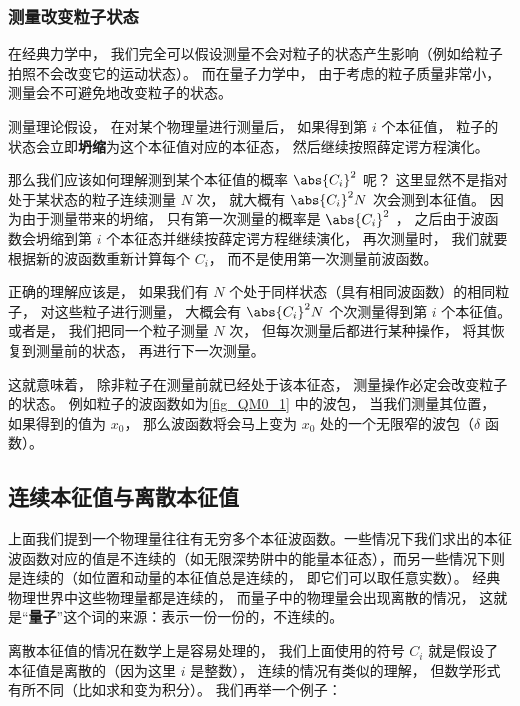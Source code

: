 \subsubsection{测量改变粒子状态}
在经典力学中， 我们完全可以假设测量不会对粒子的状态产生影响（例如给粒子拍照不会改变它的运动状态）。 而在量子力学中， 由于考虑的粒子质量非常小， 测量会不可避免地改变粒子的状态。

测量理论假设， 在对某个物理量进行测量后， 如果得到第 $i$ 个本征值， 粒子的状态会立即\textbf{坍缩}为这个本征值对应的本征态， 然后继续按照薛定谔方程演化。

那么我们应该如何理解测到某个本征值的概率 $\abs{C_i}^2$ 呢？ 这里显然不是指对处于某状态的粒子连续测量 $N$ 次， 就大概有 $\abs{C_i}^2 N$ 次会测到本征值。 因为由于测量带来的坍缩， 只有第一次测量的概率是 $\abs{C_i}^2$ ， 之后由于波函数会坍缩到第 $i$ 个本征态并继续按薛定谔方程继续演化， 再次测量时， 我们就要根据新的波函数重新计算每个 $C_i$， 而不是使用第一次测量前波函数。

正确的理解应该是， 如果我们有 $N$ 个处于同样状态（具有相同波函数）的相同粒子， 对这些粒子进行测量， 大概会有 $\abs{C_i}^2 N$ 个次测量得到第 $i$ 个本征值。 或者是， 我们把同一个粒子测量 $N$ 次， 但每次测量后都进行某种操作， 将其恢复到测量前的状态， 再进行下一次测量。

这就意味着， 除非粒子在测量前就已经处于该本征态， 测量操作必定会改变粒子的状态。 例如粒子的波函数如为\autoref{fig_QM0_1} 中的波包， 当我们测量其位置， 如果得到的值为 $x_0$， 那么波函数将会马上变为 $x_0$ 处的一个无限窄的波包（$\delta$ 函数）。

\subsection{连续本征值与离散本征值}
上面我们提到一个物理量往往有无穷多个本征波函数。一些情况下我们求出的本征波函数对应的值是不连续的（如无限深势阱中的能量本征态），而另一些情况下则是连续的（如位置和动量的本征值总是连续的， 即它们可以取任意实数）。 经典物理世界中这些物理量都是连续的， 而量子中的物理量会出现离散的情况， 这就是“\textbf{量子}”这个词的来源：表示一份一份的，不连续的。

离散本征值的情况在数学上是容易处理的， 我们上面使用的符号 $C_i$ 就是假设了本征值是离散的（因为这里 $i$ 是整数）， 连续的情况有类似的理解， 但数学形式有所不同（比如求和变为积分）。 我们再举一个例子：


